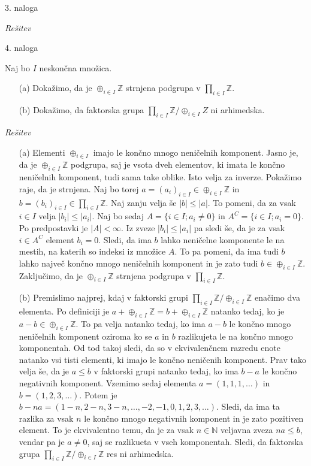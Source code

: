 \documentclass[a4paper, 12pt]{article}
\newcommand{\N}{\mathbb{N}}
\newcommand{\Z}{\mathbb{Z}}
\begin{document}
\begin{flushleft}
3. naloga
\end{flushleft}
\emph{Rešitev}

\begin{flushleft}
4. naloga
\end{flushleft}
Naj bo $I$ neskončna množica.
\begin{enumerate}
\item[(a)] Dokažimo, da je $\oplus_{i\in I} \Z$ strnjena podgrupa v $\prod_{i\in I} \Z$.
\item[(b)] Dokažimo, da faktorska grupa $\prod_{i\in I} \Z / \oplus_{i\in I} Z$ ni arhimedska.
\end{enumerate}
\emph{Rešitev}
\begin{enumerate}
\item[(a)] Elementi $\oplus_{i\in I}$ imajo le končno mnogo neničelnih komponent. Jasno je, da je $\oplus_{i \in I} \Z$ podgrupa, saj je vsota dveh elementov, ki imata le končno neničelnih komponent, tudi sama take oblike. Isto velja za inverze. Pokažimo raje, da je strnjena. Naj bo torej $a = (a_i)_{i\in I}\in \oplus_{i \in I} \Z$ in $b = (b_i)_{i\in I}\in \prod_{i\in I} \Z$. Naj zanju velja še $|b| \le |a|$. To pomeni, da za vsak $i\in I$ velja $|b_i| \le |a_i|$. Naj bo sedaj $A= \{ i \in I; a_i \neq 0\}$ in $A^C = \{i\in I; a_i =0\}$. Po predpostavki je $|A| < \infty$. Iz zveze $|b_i| \le |a_i| $ pa sledi še, da je za vsak $i\in A^C$ element $b_i=0$. Sledi, da ima $b$ lahko neničelne komponente le na mestih, na katerih so indeksi iz množice $A$. To pa pomeni, da ima tudi $b$ lahko največ končno mnogo neničelnih komponent in je zato tudi $b\in \oplus_{i\in I} \Z$. Zaključimo, da je $\oplus_{i\in I}\Z$ strnjena podgrupa v $\prod_{i \in I} \Z$.
\item[(b)] Premislimo najprej, kdaj v faktorski grupi $\prod_{i\in I} \Z/ \oplus_{i\in I} \Z$ enačimo dva elementa. Po definiciji je $a + \oplus_{i\in I} \Z = b + \oplus_{i\in I} \Z $ natanko tedaj, ko je $a-b\in \oplus_{i\in I} \Z$. To pa velja natanko tedaj, ko ima $a-b$ le končno mnogo neničelnih komponent oziroma ko se $a$ in $b$ razlikujeta le na končno mnogo komponentah. Od tod takoj sledi, da so v ekvivalenčnem razredu enote natanko vsi tisti elementi, ki imajo le končno neničenih komponent. Prav tako velja še, da je $a\le b$ v faktorski grupi natanko tedaj, ko ima $b-a$ le končno negativnih komponent. Vzemimo sedaj elementa $a=(1,1,1,\dots)$ in $b=(1,2,3,\dots)$. Potem je $b-na = (1-n,2-n,3-n,\dots, -2,-1,0,1,2,3,\dots)$. Sledi, da ima ta  razlika za vsak $n$ le končno mnogo negativnih komponent in je zato  pozitiven element. To je ekvivalentno temu, da je za vsak $n\in \N$ veljavna zveza $na \le b$, vendar pa je $a\neq 0$, saj se razlikueta v vseh komponentah. Sledi, da faktorska grupa $\prod_{i\in I}\Z/ \oplus_{i\in I} \Z$ res ni arhimedska.
\end{enumerate}
\end{document}
